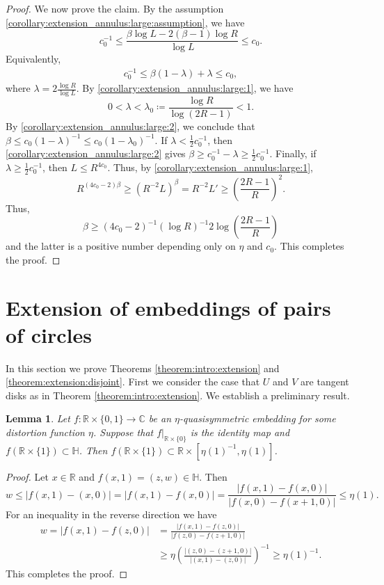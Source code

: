 \documentclass[letterpaper]{amsart}
\theoremstyle{plain}
\newtheorem{lemma}[theorem]{Lemma}
\theoremstyle{definition}
\theoremstyle{remark}
\numberwithin{equation}{section}
\numberwithin{theorem}{section}
\newcommand{\R}{\mathbb R}
\newcommand{\C}{\mathbb C}
\newcommand{\UHP}{\mathbb H}
\begin{document}
\begin{proof}
We now prove the claim. By the assumption \eqref{corollary:extension_annulus:large:assumption}, we have
$$c_0^{-1}\leq \frac{\beta\log L-2(\beta-1)\log R}{\log L}\leq c_0.$$
Equivalently, 
\begin{align}\label{corollary:extension_annulus:large:2}
c_0^{-1} \leq \beta\left( 1 -\lambda \right)+\lambda \leq c_0,
\end{align}
where $\lambda=2\frac{\log R}{\log L}$. By \eqref{corollary:extension_annulus:large:1}, we have  
$$0< \lambda < \lambda_0\coloneqq \frac{\log R}{\log (2R-1)}<1.$$
By \eqref{corollary:extension_annulus:large:2}, we conclude that $\beta\leq c_0(1-\lambda)^{-1}\leq c_0(1-\lambda_0)^{-1}$. If $\lambda<\frac{1}{2}c_0^{-1}$, then \eqref{corollary:extension_annulus:large:2} gives $\beta\geq c_0^{-1}-\lambda\geq \frac{1}{2}c_0^{-1}$.  Finally, if $\lambda\geq \frac{1}{2}c_0^{-1}$, then $L\leq R^{4c_0}$. Thus, by \eqref{corollary:extension_annulus:large:1},
$$R^{(4c_0-2)\beta} \geq (R^{-2}L)^\beta = R^{-2}L'\geq  \left(\frac{2R-1}{R}\right)^2.$$
Thus,
$$\beta \geq (4c_0-2)^{-1} (\log R)^{-1}2\log\left(\frac{2R-1}{R}\right)$$
and the latter is a positive number depending only on $\eta$ and $c_0$. 
This completes the proof. 
\end{proof}

\section{Extension of embeddings of pairs of circles}\label{section:extension_disks}

In this section we prove Theorems \ref{theorem:intro:extension} and \ref{theorem:extension:disjoint}. First we consider the case that $U$ and $V$ are tangent disks as in Theorem \ref{theorem:intro:extension}. We establish a preliminary result.

\begin{lemma}\label{lemma:strip_bounds}
Let $f\colon \R\times \{0,1\}\to \C$ be an $\eta$-quasisymmetric embedding for some distortion function $\eta$. Suppose that $f|_{\R\times \{0\}}$ is the identity map and $f(\R\times \{1\})\subset \UHP$. Then $f(\R\times \{1\})\subset \R\times [\eta(1)^{-1},\eta(1)]$.
\end{lemma}

\begin{proof}
Let $x\in \R$ and $f(x,1)=(z,w)\in \UHP$. Then 
$$w\leq |f(x,1)-(x,0)|=|f(x,1)-f(x,0)|=  \frac{|f(x,1)-f(x,0)|}{|f(x,0)-f(x+1,0)|} \leq \eta(1).$$
For an inequality in the reverse direction we have
\begin{align*}
w=|f(x,1)-f(z,0)|&=  \frac{|f(x,1)-f(z,0)|}{|f(z,0)-f(z+1,0)|} \\
&\geq  \eta\left(\frac{|(z,0)-(z+1,0)|}{|(x,1)-(z,0)|} \right)^{-1} \geq \eta(1)^{-1}.
\end{align*} 
This completes the proof.
\end{proof}
\end{document}
